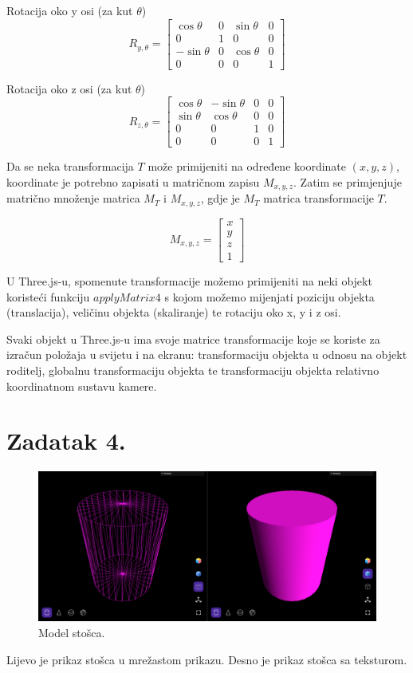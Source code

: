 \documentclass[a4paper,12pt]{article}
\begin{document}
Rotacija oko y osi (za kut $\theta$)
\[
R_{y,\theta}=
\begin{bmatrix}
    \cos{\theta} & 0 & \sin{\theta} & 0 \\
    0 & 1 & 0 & 0 \\
    -\sin{\theta} & 0 & \cos{\theta} & 0 \\
    0 & 0 & 0 & 1
\end{bmatrix}
\]

Rotacija oko z osi (za kut $\theta$)
\[
R_{z,\theta}=
\begin{bmatrix}
    \cos{\theta} & -\sin{\theta} & 0 & 0 \\
    \sin{\theta} & \cos{\theta} & 0 & 0 \\
    0 & 0 & 1 & 0 \\
    0 & 0 & 0 & 1
\end{bmatrix}
\]

\pagebreak

Da se neka transformacija $T$ može primijeniti na određene koordinate $(x, y, z)$, koordinate je
potrebno zapisati u matričnom zapisu $M_{x,y,z}$. Zatim se primjenjuje matrično množenje
matrica $M_T$ i $M_{x,y,z}$, gdje je $M_T$ matrica transformacije $T$.

\[
M_{x,y,z}=
\begin{bmatrix}
    x \\
    y \\
    z \\
    1
\end{bmatrix}
\]

U Three.js-u, spomenute transformacije možemo primijeniti na neki objekt koristeći
funkciju $applyMatrix4$ s kojom možemo mijenjati poziciju objekta (translacija),
veličinu objekta (skaliranje) te rotaciju oko x, y i z osi.

Svaki objekt u Three.js-u ima svoje matrice transformacije koje se koriste za izračun
položaja u svijetu i na ekranu: 
transformaciju objekta u odnosu na objekt roditelj, globalnu transformaciju objekta te 
transformaciju objekta relativno koordinatnom sustavu kamere.

\pagebreak

\section*{Zadatak 4.}

\begin{figure}[ht]
    \centering
    \includegraphics[scale=0.5]{image/zadatak4.png}
    \caption{Model stošca.}
\end{figure}
Lijevo je prikaz stošca u mrežastom prikazu. Desno je prikaz stošca sa teksturom.
\end{document}
